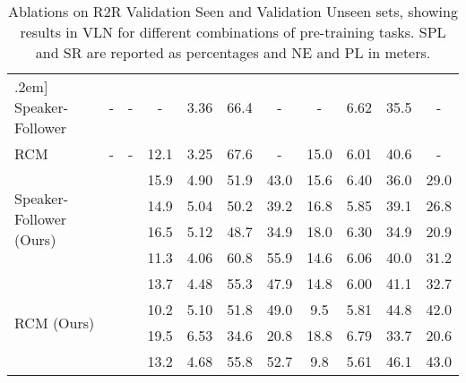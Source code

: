 \documentclass[10pt,twocolumn,letterpaper]{article}
\newcommand{\cmark}{\ding{51}}\newcommand{\xmark}{\ding{55}}\newcommand{\taskcma}{\textsc{cma}}
\begin{document}
\begin{table*}
\centering
\setlength\tabcolsep{4.5pt}
\begin{tabular}{lcccccccccc}\0.2em]\Xhline{2\arrayrulewidth} 
Speaker-Follower \cite{Fried:2018:Speaker}                        &  -      & -      & -    & 3.36 & 66.4 & -    & -    & 6.62 & 35.5 & -\\
RCM\cite{Wang:2018:RCM}                                     & -       & -      & 12.1 & 3.25 & 67.6 & -    & 15.0 & 6.01 & 40.6 & - \\\hline

\multirow{4}{*}{Speaker-Follower (Ours)} & \xmark      &  \xmark        & 15.9 & 4.90 & 51.9 & 43.0 & 15.6 & 6.40 & 36.0 & 29.0 \\
                                        & \cmark   & \xmark      & 14.9 & 5.04 & 50.2 & 39.2 & 16.8 & 5.85 & 39.1 & 26.8 \\
                                        & \xmark   & \cmark       & 16.5    & 5.12    & 48.7    & 34.9    & 18.0    & 6.30    & 34.9    & 20.9    \\
                                        & \cmark  & \cmark & 11.3    & 4.06    & 60.8    & 55.9    & 14.6    & 6.06    & 40.0    & 31.2     \\
\hline
\multirow{4}{*}{RCM (Ours)}              & \xmark  & \xmark & 13.7 & 4.48 & 55.3 & 47.9 & 14.8 & 6.00 & 41.1 & 32.7 \\
                                        & \cmark  & \xmark & 10.2 & 5.10 & 51.8 & 49.0 & 9.5  & 5.81 & 44.8 & 42.0 \\
                                        & \xmark  & \cmark & 19.5    & 6.53    & 34.6    & 20.8    & 18.8    & 6.79    & 33.7    & 20.6   \\
                                        & \cmark  & \cmark & 13.2 & 4.68 & 55.8 & 52.7 & 9.8  & 5.61 & 46.1 & 43.0 \\
\end{tabular}
\caption{Ablations on R2R Validation Seen and Validation Unseen sets, showing results in VLN for different combinations of pre-training tasks. SPL and SR are reported as percentages and NE and PL in meters.}
\label{tab:task-ablation}
\end{table*}
\end{document}
